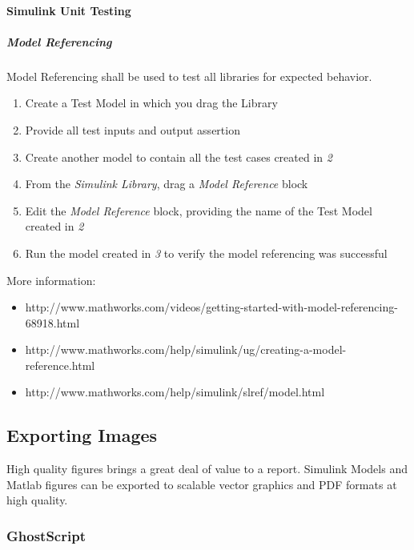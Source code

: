 \documentclass[]{article}
\providecommand{\tightlist}{%
  \setlength{\itemsep}{0pt}\setlength{\parskip}{0pt}}
\let\oldparagraph\paragraph
\renewcommand{\paragraph}[1]{\oldparagraph{#1}\mbox{}}
\let\oldsubparagraph\subparagraph
\renewcommand{\subparagraph}[1]{\oldsubparagraph{#1}\mbox{}}
\begin{document}
\paragraph{Simulink Unit Testing}\label{simulink-unit-testing}

\subparagraph{Model Referencing}\label{model-referencing}

Model Referencing shall be used to test all libraries for expected
behavior.

\begin{enumerate}
\def\labelenumi{\arabic{enumi}.}
\tightlist
\item
  Create a Test Model in which you drag the Library
\item
  Provide all test inputs and output assertion
\item
  Create another model to contain all the test cases created in \emph{2}
\item
  From the \emph{Simulink Library}, drag a \emph{Model Reference} block
\item
  Edit the \emph{Model Reference} block, providing the name of the Test
  Model created in \emph{2}
\item
  Run the model created in \emph{3} to verify the model referencing was
  successful
\end{enumerate}

More information:

\begin{itemize}
\tightlist
\item
  http://www.mathworks.com/videos/getting-started-with-model-referencing-68918.html
\item
  http://www.mathworks.com/help/simulink/ug/creating-a-model-reference.html
\item
  http://www.mathworks.com/help/simulink/slref/model.html
\end{itemize}

\subsection{Exporting Images}\label{exporting-images}

High quality figures brings a great deal of value to a report. Simulink
Models and Matlab figures can be exported to scalable vector graphics
and PDF formats at high quality.

\subsubsection{GhostScript}\label{ghostscript}
\end{document}
